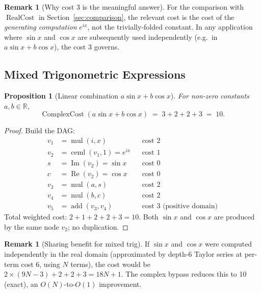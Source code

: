 \documentclass[12pt,a4paper]{article}
\newtheorem{proposition}[theorem]{Proposition}
\theoremstyle{definition}
\newtheorem{remark}[theorem]{Remark}
\newcommand{\ceml}{\operatorname{ceml}}
\newcommand{\RC}{\operatorname{RealCost}}
\newcommand{\CC}{\operatorname{ComplexCost}}
\begin{document}
\begin{remark}[Why cost 3 is the meaningful answer]
For the comparison with $\RC$ in Section~\ref{sec:comparison}, the relevant
cost is the cost of the \emph{generating computation} $e^{ix}$, not the
trivially-folded constant.
In any application where $\sin x$ and $\cos x$ are subsequently used
independently (e.g.\ in $a\sin x + b\cos x$), the cost 3 governs.
\end{remark}

\subsection{Mixed Trigonometric Expressions}

\begin{proposition}[Linear combination $a\sin x + b\cos x$]
\label{prop:linear-trig}
For non-zero constants $a, b \in \mathbb{R}$,
\[
  \CC(a\sin x + b\cos x) \;=\; 3 + 2 + 2 + 3 \;=\; 10.
\]
\end{proposition}

\begin{proof}
Build the DAG:
\begin{align*}
  v_1 &= \operatorname{mul}(i, x) & &\text{cost } 2 \\
  v_2 &= \ceml(v_1, 1) = e^{ix} & &\text{cost } 1 \\
  s   &= \operatorname{Im}(v_2) = \sin x & &\text{cost } 0 \\
  c   &= \operatorname{Re}(v_2) = \cos x & &\text{cost } 0 \\
  v_3 &= \operatorname{mul}(a, s) & &\text{cost } 2 \\
  v_4 &= \operatorname{mul}(b, c) & &\text{cost } 2 \\
  v_5 &= \operatorname{add}(v_3, v_4) & &\text{cost } 3 \text{ (positive domain)}
\end{align*}
Total weighted cost: $2 + 1 + 2 + 2 + 3 = 10$.
Both $\sin x$ and $\cos x$ are produced by the same node $v_2$; no duplication.
\end{proof}

\begin{remark}[Sharing benefit for mixed trig]
If $\sin x$ and $\cos x$ were computed independently in the real domain
(approximated by depth-6 Taylor series at per-term cost 6, using $N$ terms),
the cost would be $2 \times (9N - 3) + 2 + 2 + 3 = 18N + 1$.
The complex bypass reduces this to 10 (exact), an $O(N)$-to-$O(1)$ improvement.
\end{remark}
\end{document}
